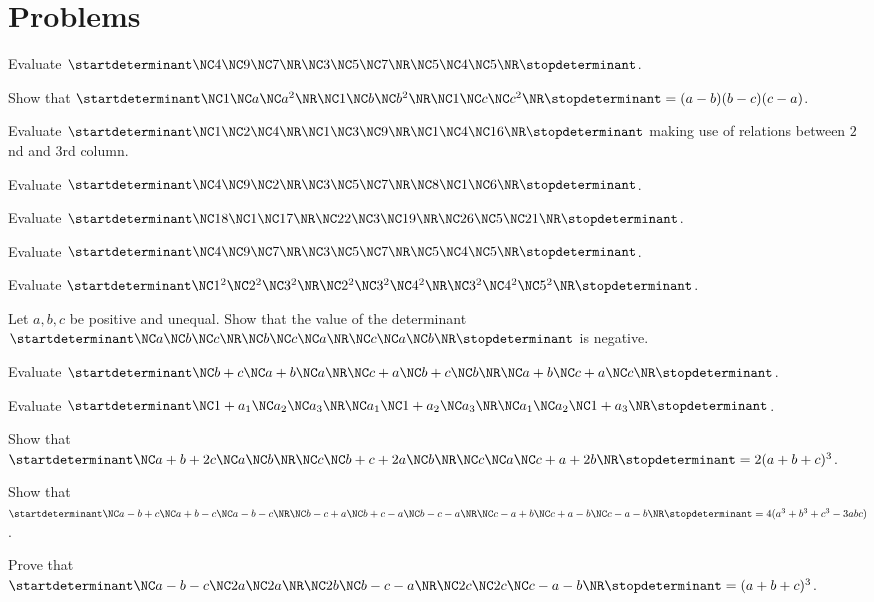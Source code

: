 \section{Problems}
\startitemize[n, 1*broad]
\item Evaluate $\startdeterminant\NC  4 \NC 9 \NC 7\NR\NC 3 \NC 5 \NC 7\NR\NC 5 \NC 4 \NC 5\NR\stopdeterminant$.
\item Show that $\startdeterminant\NC  1 \NC a\NC a^2\NR\NC 1 \NC b \NC b^2\NR\NC 1 \NC c \NC c^2\NR\stopdeterminant = (a - b)(b - c)(c - a)$.
\item Evaluate $\startdeterminant\NC  1 \NC 2\NC 4\NR\NC 1 \NC 3 \NC 9\NR\NC 1 \NC 4 \NC 16\NR\stopdeterminant$ making use of relations between $2$nd and $3$rd
  column.
\item Evaluate $\startdeterminant\NC  4 \NC 9 \NC 2\NR\NC 3 \NC 5 \NC 7\NR\NC 8 \NC 1 \NC 6\NR\stopdeterminant$.
\item Evaluate $\startdeterminant\NC  18 \NC 1 \NC 17\NR\NC 22 \NC 3 \NC 19\NR\NC 26 \NC 5 \NC 21\NR\stopdeterminant$.
\item Evaluate $\startdeterminant\NC  4 \NC 9 \NC 7\NR\NC 3 \NC 5 \NC 7\NR\NC 5 \NC 4 \NC 5\NR\stopdeterminant$.
\item Evaluate $\startdeterminant\NC  1^2 \NC 2^2 \NC 3^2\NR\NC 2^2 \NC 3^2 \NC 4^2\NR\NC 3^2 \NC 4^2 \NC 5^2\NR\stopdeterminant$.
\item Let $a, b, c$ be positive and unequal. Show that the value of the determinant $\startdeterminant\NC  a \NC b \NC c\NR\NC b \NC c \NC a\NR\NC c \NC a \NC
  b\NR\stopdeterminant$ is negative.
\item Evaluate $\startdeterminant\NC  b + c\NC a + b \NC a\NR\NC c + a \NC b + c \NC b\NR\NC a + b \NC c + a \NC c\NR\stopdeterminant$.
\item Evaluate $\startdeterminant\NC  1 + a_1 \NC a_2 \NC a_3\NR\NC a_1 \NC 1+ a_2 \NC a_3\NR\NC a_1 \NC a_2 \NC 1 + a_3\NR\stopdeterminant$.
\item Show that $\startdeterminant\NC  a + b + 2c \NC a \NC b\NR\NC c \NC b + c + 2a \NC b\NR\NC c \NC a \NC c + a + 2b\NR\stopdeterminant = 2(a + b + c)^3$.
\item Show that $\startdeterminant\NC  a - b + c \NC a + b - c \NC a - b - c\NR\NC  b - c + a \NC b + c -a \NC b - c - a\NR\NC  c - a + b \NC c + a - b \NC c -
  a -b\NR\stopdeterminant = 4(a^3 + b^3 + c^3 - 3abc)$.
\item Prove that $\startdeterminant\NC  a - b - c \NC 2a \NC 2a\NR\NC 2b \NC b - c - a\NR\NC 2c \NC 2c \NC c - a - b\NR\stopdeterminant = (a + b + c)^3$.
